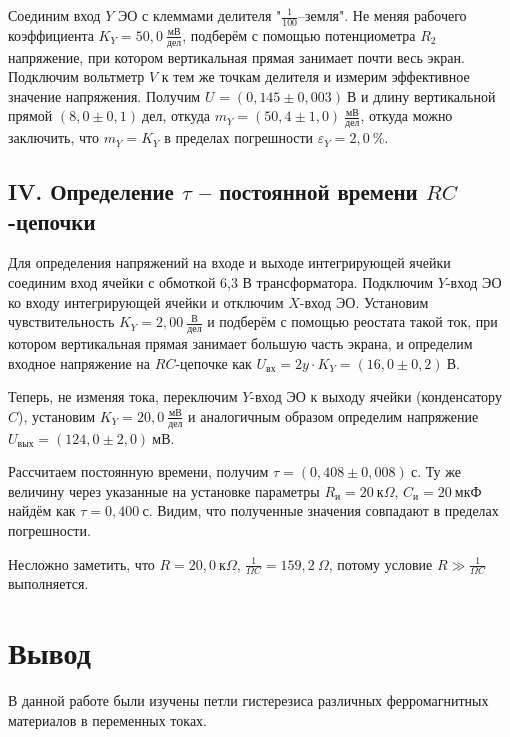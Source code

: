 \documentclass[a4paper,10pt]{article}
\begin{document}
Соединим вход $Y$ ЭО с клеммами делителя "$\frac{1}{100}$--земля". Не меняя рабочего коэффициента $K_Y=50,0~\frac{\text{мВ}}{\text{дел}}$, подберём с помощью потенциометра $R_2$ напряжение, при котором вертикальная прямая занимает почти весь экран. Подключим вольтметр $V$ к тем же точкам делителя и измерим эффективное значение напряжения. Получим $U_{\text{}}=\left(0,145\pm0,003\right)~\text{В}$ и длину вертикальной прямой $\left(8,0\pm0,1\right)~\text{дел}$, откуда $m_Y=\left(50,4\pm1,0\right)~\frac{\text{мВ}}{\text{дел}}$, откуда можно заключить, что $m_Y=K_Y$ в пределах погрешности $\varepsilon_Y=2,0~\%$.

\subsection*{IV. Определение $\tau$ -- постоянной времени $RC$-цепочки}

Для определения напряжений на входе и выходе интегрирующей ячейки соединим вход ячейки с обмоткой 6,3 В трансформатора. Подключим $Y$-вход ЭО ко входу интегрирующей ячейки и отключим $X$-вход ЭО. Установим чувствительность $K_Y=2,00~\frac{\text{В}}{\text{дел}}$ и подберём с помощью реостата такой ток, при котором вертикальная прямая занимает большую часть экрана, и определим входное напряжение на $RC$-цепочке как $U_{\text{вх}}=2y\cdot K_Y=\left(16,0\pm0,2\right)~\text{В}$.

Теперь, не изменяя тока, переключим $Y$-вход ЭО к выходу ячейки (конденсатору $C$), установим $K_Y=20,0~\frac{\text{мВ}}{\text{дел}}$ и аналогичным образом определим напряжение $U_{\text{вых}}=\left(124,0\pm2,0\right)~\text{мВ}$.

Рассчитаем постоянную времени, получим $\tau=\left(0,408\pm0,008\right)~\text{с}$. Ту же величину через указанные на установке параметры $R_{\text{и}}=20~\text{к$\Omega$}$, $C_{\text{и}}=20~\text{мкФ}$ найдём как $\tau=0,400~\text{с}$. Видим, что полученные значения совпадают в пределах погрешности.

Несложно заметить, что $R=20,0~\text{к$\Omega$}$, $\frac{1}{\Omega C}=159,2~\Omega$, потому условие $R\gg\frac{1}{\Omega C}$ выполняется.

\section*{Вывод}

В данной работе были изучены петли гистерезиса различных ферромагнитных материалов в переменных токах.
\end{document}
